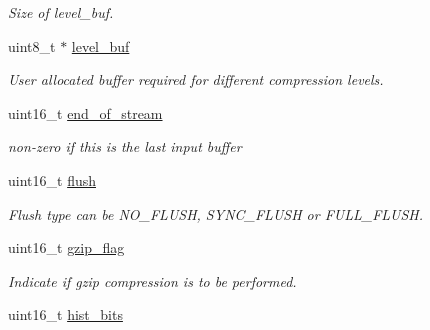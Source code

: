\begin{DoxyCompactItemize}
\begin{DoxyCompactList}\small\item\em Size of level\-\_\-buf. \end{DoxyCompactList}\item 
\hypertarget{structisal__zstream_afd3126f1572c50c48d9fc00906589ab5}{uint8\-\_\-t $\ast$ \hyperlink{structisal__zstream_afd3126f1572c50c48d9fc00906589ab5}{level\-\_\-buf}}\label{structisal__zstream_afd3126f1572c50c48d9fc00906589ab5}

\begin{DoxyCompactList}\small\item\em User allocated buffer required for different compression levels. \end{DoxyCompactList}\item 
\hypertarget{structisal__zstream_a8eb1025e062bff0676c9e87e53786017}{uint16\-\_\-t \hyperlink{structisal__zstream_a8eb1025e062bff0676c9e87e53786017}{end\-\_\-of\-\_\-stream}}\label{structisal__zstream_a8eb1025e062bff0676c9e87e53786017}

\begin{DoxyCompactList}\small\item\em non-\/zero if this is the last input buffer \end{DoxyCompactList}\item 
\hypertarget{structisal__zstream_af508d21a8ce51e9791b0a8dcef0a6aa3}{uint16\-\_\-t \hyperlink{structisal__zstream_af508d21a8ce51e9791b0a8dcef0a6aa3}{flush}}\label{structisal__zstream_af508d21a8ce51e9791b0a8dcef0a6aa3}

\begin{DoxyCompactList}\small\item\em Flush type can be N\-O\-\_\-\-F\-L\-U\-S\-H, S\-Y\-N\-C\-\_\-\-F\-L\-U\-S\-H or F\-U\-L\-L\-\_\-\-F\-L\-U\-S\-H. \end{DoxyCompactList}\item 
\hypertarget{structisal__zstream_a1533fae7c0608f5c651df09da21a9d58}{uint16\-\_\-t \hyperlink{structisal__zstream_a1533fae7c0608f5c651df09da21a9d58}{gzip\-\_\-flag}}\label{structisal__zstream_a1533fae7c0608f5c651df09da21a9d58}

\begin{DoxyCompactList}\small\item\em Indicate if gzip compression is to be performed. \end{DoxyCompactList}\item 
\hypertarget{structisal__zstream_aaba002a436d34dc8080a3eee6317ffba}{uint16\-\_\-t \hyperlink{structisal__zstream_aaba002a436d34dc8080a3eee6317ffba}{hist\-\_\-bits}}\label{structisal__zstream_aaba002a436d34dc8080a3eee6317ffba}


\end{DoxyCompactItemize}
